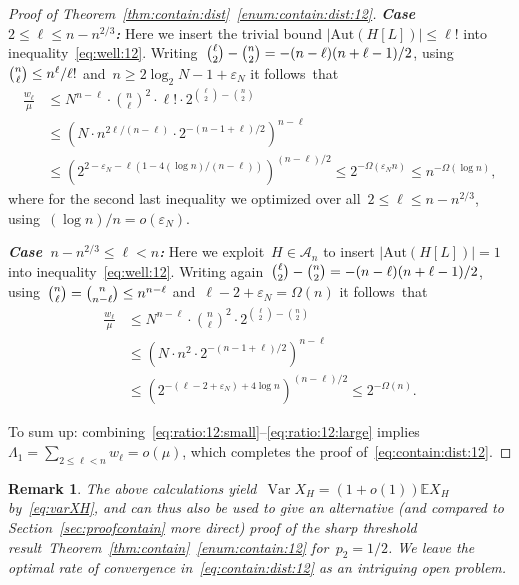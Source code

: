 \documentclass{article}
\newcommand{\eps}{\varepsilon}
\newcommand{\E}{\mathbb{E}}
\newcommand{\cA}{\mathcal{A}}
\newcommand\lrpar[1]{\left(#1\right)}
\newcommand\Var{\operatorname{Var}}
\newcommand{\Aut}{\mathrm{Aut}}
\newcommand{\w}{w}
\newtheorem{remark}{Remark}
\newcommand{\refT}[1]{Theorem~\ref{#1}}
\begin{document}
\begin{proof}[Proof of \refT{thm:contain:dist}~\ref{enum:contain:dist:12}]
\textit{\bf Case~$2 \leq \ell \le n - n^{2/3}$:} 
Here we insert the trivial bound $|\Aut(H[L])| \le \ell!$ into inequality~\eqref{eq:well:12}.
Writing~${\tbinom{\ell}{2}-\tbinom{n}{2}}= {-(n-\ell)(n+\ell-1)/2}$, 
using~$\tbinom{n}{\ell} \le n^\ell/\ell!$ and~${n \ge 2\log_2 N -1+\eps_N}$ it follows~that  
\begin{equation}\label{eq:ratio:12:small}
\begin{split}
\frac{\w_\ell}{\mu} 
&\leq N^{n-\ell} \cdot \binom{n}{\ell}^2 \cdot \ell! \cdot 2^{\binom{\ell}{2}-\binom{n}{2}} \\
& \leq \lrpar{N \cdot n^{2\ell/(n-\ell)} \cdot  2^{-(n-1+\ell)/2} }^{n-\ell}\\
& \leq \lrpar{2^{2-\eps_N - \ell(1-4(\log n)/(n-\ell))}}^{(n-\ell)/2} \leq 2^{-\Omega(\eps_N n)} \leq n^{-\Omega(\log n)},
\end{split}
\end{equation}
where for the second last inequality we optimized over all~$2 \leq \ell \le n - n^{2/3}$, using~$(\log n)/n = o(\eps_N)$.

\textit{\bf Case~$n - n^{2/3} \leq \ell < n$:} 
Here we exploit~$H \in \cA_n$ 
to insert $|\Aut(H[L])| =1$ into inequality~\eqref{eq:well:12}.
Writing again~${\tbinom{\ell}{2}-\tbinom{n}{2}}= {-(n-\ell)(n+\ell-1)/2}$, 
using~$\tbinom{n}{\ell}=\tbinom{n}{n-\ell} \le n^{n-\ell}$ 
and~$\ell-2+\eps_N=\Omega(n)$ it follows~that
\begin{equation}\label{eq:ratio:12:large}
\begin{split}
\frac{\w_\ell}{\mu} 
&\leq N^{n-\ell} \cdot \binom{n}{\ell}^2 \cdot 2^{\binom{\ell}{2}-\binom{n}{2}}\\
& \leq \lrpar{N \cdot n^2 \cdot 2^{-(n-1+\ell)/2}}^{n-\ell} \\
& \leq 
\lrpar{2^{-(\ell-2+\eps_N)+4 \log n}}^{(n-\ell)/2} \le 2^{-\Omega(n)}.
\end{split}
\end{equation}

To sum up: combining~\eqref{eq:ratio:12:small}--\eqref{eq:ratio:12:large} implies~$\Lambda_1=\sum_{2 \le \ell < n}\w_\ell=o(\mu)$, 
which completes the proof of~\eqref{eq:contain:dist:12}. 
\end{proof}


\begin{remark}\label{rem:sec:dist:poisson}
The above calculations yield~$\Var X_H =(1+o(1)) \E X_H$ by~\eqref{eq:varXH}, and can thus also be used to give an alternative (and compared to Section~\ref{sec:proofcontain} more direct) proof of the sharp threshold result~\refT{thm:contain}~\ref{enum:contain:12} for~$p_2=1/2$. 
We leave the optimal rate of convergence in~\eqref{eq:contain:dist:12} as an intriguing open problem. 
\end{remark}
\end{document}
